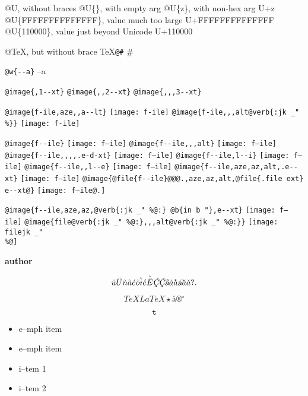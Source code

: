 \documentclass{book}
\renewcommand{\includegraphics}[1]{\fbox{FIG \detokenize{#1}}}
\begin{document}
@U, without braces @U\{\}, with empty arg 
@U\{z\}, with non-hex arg U+z
@U\{FFFFFFFFFFFFFF\}, value much too large U+FFFFFFFFFFFFFF
@U\{110000\}, value just beyond Unicode U+110000

@TeX, but without brace \TeX{}\texttt{@\#} \#

\texttt{@w\{{-}{-}a\}} \hbox{--a}

\texttt{@image\{,1{-}{-}xt\}} 
\texttt{@image\{,,2{-}{-}xt\}} 
\texttt{@image\{,,,3{-}{-}xt\}} 

\texttt{@image\{f-ile,aze,,a{-}{-}lt\}} \texttt{[image: f-ile]}
\texttt{@image\{f-ile,,,alt@verb\{:jk \_" \%\@\}\}} \texttt{[image: f-ile]}

\texttt{@image\{f{-}{-}ile\}} \texttt{[image: f--ile]}
\texttt{@image\{f{-}{-}ile,,,alt\}} \texttt{[image: f--ile]}
\texttt{@image\{f{-}{-}ile,,,,.e-d-xt\}} \texttt{[image: f--ile]}
\texttt{@image\{f{-}{-}ile,l{-}{-}i\}} \texttt{[image: f--ile]}
\texttt{@image\{f{-}{-}ile,,l{-}{-}e\}} \texttt{[image: f--ile]}
\texttt{@image\{f{-}{-}ile,aze,az,alt,.e{-}{-}xt\}} \texttt{[image: f--ile]}
\texttt{@image\{@file\{f{-}{-}ile\}@@@.,aze,az,alt,@file\{.file ext\} e{-}{-}xt@\}} \texttt{[image: f--ile@.]}

\texttt{@image\{f{-}{-}ile,aze,az,@verb\{:jk \_" \%@:\} @b\{in b "\},e{-}{-}xt\}} \texttt{[image: f--ile]}
\texttt{@image\{file@verb\{:jk \_" \%@:\},,,alt@verb\{:jk \_" \%@:\}\}} \texttt{[image: filejk \_" \\\%@]}


{\bfseries author}%

$$
\ddot{u} \ddot{U} \tilde{n} \hat{a} \acute{e} \bar{o} \grave{i} \acute{e} \grave{\bar{E}}
\textsl{\c{\'{C}}} \textsl{\c{\'{C}}} \textsl{\H{a}} \dot{a} \mathring{a} \textsl{\t{a}}
\breve{a} \check{a}
 ? .
$$

$$
TeX LaTeX \star{} \mathord{\text{\aa{}}} \circledR{} ^{\circ{}} 
$$

$$
\mathtt{t} 
$$

\begin{itemize}[label=\emph{}]
\item e--mph item
\end{itemize}

\begin{itemize}[label=\emph{} after emph]
\item e--mph item
\end{itemize}

\begin{itemize}[label=\textbullet{} a--n itemize line]
\item i--tem 1
\item i--tem 2
\end{itemize}
\end{document}
